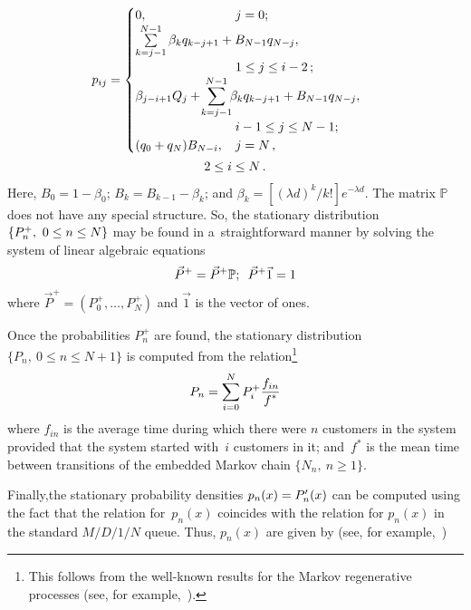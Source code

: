 \begin{multicols}{2}
\begin{multline*}
\!\!p_{ij}=
\begin{cases}
0, & \hspace*{-38mm}j=0;\\
\sum\limits_{k=j-1}^{N-1} \beta_k q_{k-j+1} +  B_{N-1} q_{N-j}, & \\
& \hspace*{-38mm}1 \le j \le i-2\,;\\
\beta_{j-i+1} Q_j + \displaystyle\!\sum\limits_{k=j-1}^{N-1}\!\! \beta_k q_{k-j+1} + 
 B_{N-1} q_{N-j}, &\\
 &\hspace*{-38mm} i-1 \le j \le N-1;\\
(q_{0} +  q_{N})B_{N-i} , &\hspace*{-38mm} j=N\,,
\end{cases}
\\
 2 \le i \le N\,.
\end{multline*}
Here, $B_0=1-\beta_0$; $B_k=B_{k-1}-\beta_k$; and 
$\beta_k=[{(\lambda d)^k / k!}]e^{-\lambda d}$.
The matrix $\mathbb{P}$ does not have any special structure. 
So, the stationary distribution $\{P^+_n, \ 0 \le n\linebreak \le N\}$
may be found in a~straightforward manner by solving the system of linear algebraic 
equations 
$$
{\vec P}^+={\vec P}^+ \mathbb{P};\enskip 
{\vec P}^+ {\vec 1} =1
$$ 
where ${\vec P}^+= (P^+_0,\dots,P^+_N)$ and $\vec 1$ is the vector of ones. 
{

}

Once the probabilities $P^+_n$ are found,
the stationary distribution \mbox{$\{P_n, \ 0 \le n \le N+1\}$} 
is computed from the relation\footnote{This follows
from the well-known results for the Markov regenerative processes (see, for 
example,~\cite[Theorem 9.19]{kulk}).} 
$$
P_n=\sum\limits_{i=0}^N P^+_i \displaystyle\frac{\displaystyle f_{in}\mathstrut}{\displaystyle f^*\mathstrut}
$$
where $f_{in}$ is the average time during which there were $n$ customers in the system
provided that the system started with~$i$ customers in it; 
and~$f^*$ is the mean time between transitions of the embedded
Markov chain $\{ N_n, \ n \ge 1\}$.
{

}


Finally,the stationary probability densities $p_n(x)\linebreak =P'_n(x)$
can be computed using the fact that the relation for~$p_n(x)$ 
coincides with the relation for $p_n(x)$ in 
the standard $M/D/1/N$ queue.
Thus, $p_n(x)$ are given by (see, for example,~\cite[p.~72]{Riordan1962})


\end{multicols}
